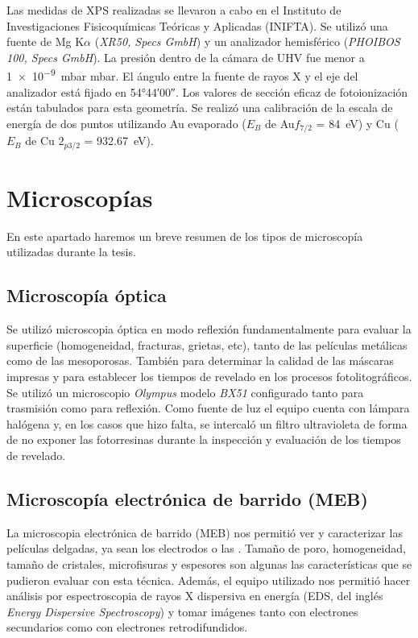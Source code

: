 		Las medidas de XPS realizadas se llevaron a cabo en el Instituto de Investigaciones Fisicoquímicas Teóricas y Aplicadas (INIFTA). Se utilizó una fuente de Mg K$\alpha$ (\textit{XR50, Specs GmbH}) y un analizador hemisférico (\textit{PHOIBOS 100, Specs GmbH}). La presión dentro de la cámara de UHV fue menor a \SI{1e-9}{mbar} mbar. El ángulo entre la fuente de rayos X y el eje del analizador está fijado en \ang{54;44;00}. Los valores de sección eficaz de fotoionización están tabulados para esta geometría. Se realizó una calibración de la escala de energía de dos puntos utilizando Au evaporado ($E_B$ de Au$f_{7/2}$ = \SI{84}{\electronvolt}) y Cu ($E_B$ de Cu $2_{p3/2}$ = \SI{932.67}{\electronvolt}).
		
\section{Microscopías}
		
	 En este apartado haremos un breve resumen de los tipos de microscopía utilizadas durante la tesis.

	\subsection{Microscopía óptica}

		Se utilizó microscopia óptica en modo reflexión fundamentalmente para evaluar la superficie (homogeneidad, fracturas, grietas, etc), tanto de las películas metálicas como de las mesoporosas. También para determinar la calidad de las máscaras impresas y para establecer los tiempos de revelado en los procesos fotolitográficos. Se utilizó un microscopio \textit{Olympus} modelo \textit{BX51} configurado tanto para trasmisión como para reflexión. Como fuente de luz el equipo cuenta con lámpara halógena y, en los casos que hizo falta, se intercaló un filtro ultravioleta de forma de no exponer las fotorresinas durante la inspección y evaluación de los tiempos de revelado.
	
	\subsection{Microscopía electrónica de barrido (MEB)}\label{sec:SEM}

		La microscopia electrónica de barrido (MEB) nos permitió ver y caracterizar las películas delgadas, ya sean los electrodos o las \pdm. Tamaño de poro, homogeneidad, tamaño de cristales, microfisuras y espesores son algunas las características que se pudieron evaluar con esta técnica. Además, el equipo utilizado nos permitió hacer análisis por espectroscopia de rayos X dispersiva en energía (EDS, del inglés \textit{Energy Dispersive Spectroscopy}) y tomar imágenes tanto con electrones secundarios como con electrones retrodifundidos. \cite{Goodhew2000,Watt1997}


